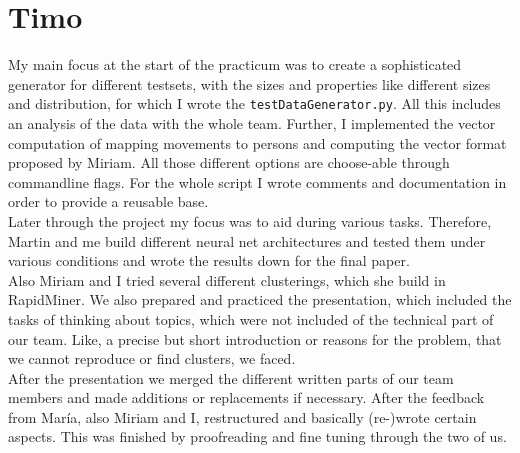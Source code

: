 \documentclass{article}
\begin{document}
\section{Timo}	
My main focus at the start of the practicum was to create a sophisticated generator for different testsets, with the sizes and properties like different sizes and distribution, for which I wrote the \texttt{testDataGenerator.py}. All this includes an analysis of the data with the whole team. Further, I implemented the vector computation of mapping movements to persons and computing the vector format proposed by Miriam. All those different options are choose-able through commandline flags. For the whole script I wrote comments and documentation in order to provide a reusable base.\\
Later through the project my focus was to aid during various tasks. Therefore, Martin and me build different neural net architectures and tested them under various conditions and wrote the results down for the final paper.\\
Also Miriam and I tried several different clusterings, which she build in RapidMiner. We also prepared and practiced the presentation, which included the tasks of thinking about topics, which were not included of the technical part of our team. Like, a precise but short introduction or reasons for the problem, that we cannot reproduce or find clusters, we faced.\\
After the presentation we merged the different written parts of our team members and made additions or replacements if necessary. After the feedback from María, also Miriam and I, restructured and basically (re-)wrote certain aspects. This 
was finished by proofreading and fine tuning through the two of us.
\end{document}

